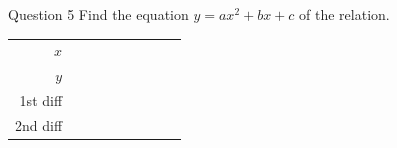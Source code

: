 \documentclass[11pt]{article}
\begin{document}
\begin{qbox}{Question 5}
Find the equation $y=ax^2+bx+c$ of the relation.
\begin{center}\renewcommand{\arraystretch}{1.15}\setlength{\tabcolsep}{2pt}\begin{tabular}{r|>{\centering\arraybackslash}p{0.62cm}>{\centering\arraybackslash}p{0.62cm}>{\centering\arraybackslash}p{0.62cm}>{\centering\arraybackslash}p{0.62cm}>{\centering\arraybackslash}p{0.62cm}>{\centering\arraybackslash}p{0.62cm}>{\centering\arraybackslash}p{0.62cm}>{\centering\arraybackslash}p{0.62cm}}
$x$ & \multicolumn{2}{c}{\colorbox{iagreen}{\makebox[1.12cm]{\strut \color{white}\bfseries $0$}}} & \multicolumn{2}{c}{\colorbox{iagreen}{\makebox[1.12cm]{\strut \color{white}\bfseries $1$}}} & \multicolumn{2}{c}{\colorbox{iagreen}{\makebox[1.12cm]{\strut \color{white}\bfseries $2$}}} & \multicolumn{2}{c}{\colorbox{iagreen}{\makebox[1.12cm]{\strut \color{white}\bfseries $3$}}} \\[2pt]
$y$ & \multicolumn{2}{c}{\colorbox{keybg}{\makebox[1.12cm]{\strut $1$}}} & \multicolumn{2}{c}{\colorbox{keybg}{\makebox[1.12cm]{\strut $2$}}} & \multicolumn{2}{c}{\colorbox{keybg}{\makebox[1.12cm]{\strut $9$}}} & \multicolumn{2}{c}{\colorbox{keybg}{\makebox[1.12cm]{\strut $22$}}} \\[2pt]
\textcolor{exblue}{\scriptsize 1st diff} & & \multicolumn{2}{c}{\colorbox{exbg}{\makebox[1.12cm]{\strut \textcolor{exblue}{$+1$}}}} & \multicolumn{2}{c}{\colorbox{exbg}{\makebox[1.12cm]{\strut \textcolor{exblue}{$+7$}}}} & \multicolumn{2}{c}{\colorbox{exbg}{\makebox[1.12cm]{\strut \textcolor{exblue}{$+13$}}}} & \\[2pt]
\textcolor{qorange}{\scriptsize 2nd diff} & & & \multicolumn{2}{c}{\colorbox{qbg}{\makebox[1.12cm]{\strut \textcolor{qorange!70!black}{$+6$}}}} & \multicolumn{2}{c}{\colorbox{qbg}{\makebox[1.12cm]{\strut \textcolor{qorange!70!black}{$+6$}}}} & & \\
\end{tabular}\end{center}\workspace{2.8cm}
\end{qbox}
\end{document}
